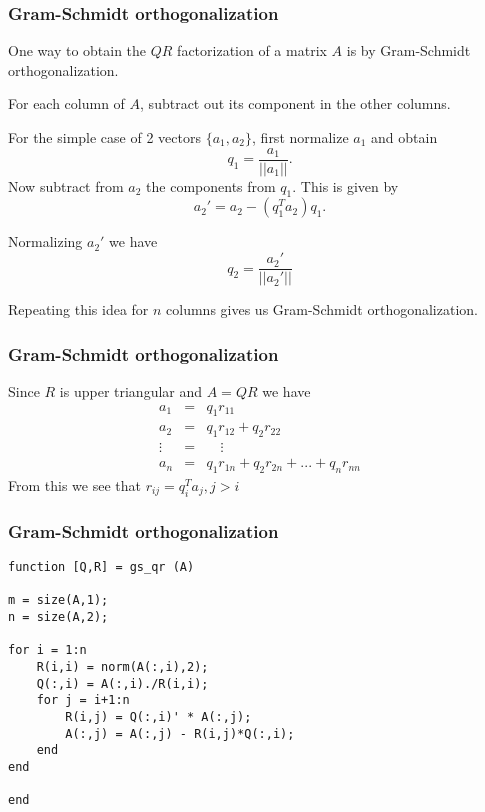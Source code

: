 \documentclass[10pt]{beamer}
\begin{document}
\begin{frame}
\frametitle{Gram-Schmidt orthogonalization}
One way to obtain the $QR$ factorization of a matrix $A$ is by Gram-Schmidt orthogonalization.

\bigskip

For each column of $A$, subtract out its component in the other columns.

\bigskip

For the simple case of 2 vectors $\{a_1,a_2\}$, first normalize $a_1$ and obtain $$q_1 = \frac{a_1}{||a_1||}.$$  Now subtract from $a_2$ the components from  $q_1$.  This is given by $$a_2' = a_2 - (q_1^Ta_2)q_1.$$  

Normalizing $a_2'$ we have $$q_2 = \frac{a_2'}{||a_2'||}$$

Repeating this idea for $n$ columns gives us Gram-Schmidt orthogonalization.
\end{frame}
\begin{frame}
\frametitle{Gram-Schmidt orthogonalization}
Since $R$ is upper triangular and $A = QR$ we have 
\begin{eqnarray*}
a_1 &=& q_1r_{11} \\
a_2 &=& q_1r_{12} + q_2r_{22} \\
\vdots &=& \quad \vdots \\
a_n &=& q_1r_{1n} + q_2r_{2n} + ... + q_nr_{nn}
\end{eqnarray*}
From this we see that $r_{ij} = q_i^T a_j, j>i$  
\end{frame}
\begin{frame}[fragile]
\frametitle{Gram-Schmidt orthogonalization}

\begin{lstlisting}
function [Q,R] = gs_qr (A)

m = size(A,1);
n = size(A,2);

for i = 1:n 
    R(i,i) = norm(A(:,i),2);
    Q(:,i) = A(:,i)./R(i,i);
    for j = i+1:n
        R(i,j) = Q(:,i)' * A(:,j);
        A(:,j) = A(:,j) - R(i,j)*Q(:,i);
    end
end

end
\end{lstlisting}
\end{frame}
\end{document}
